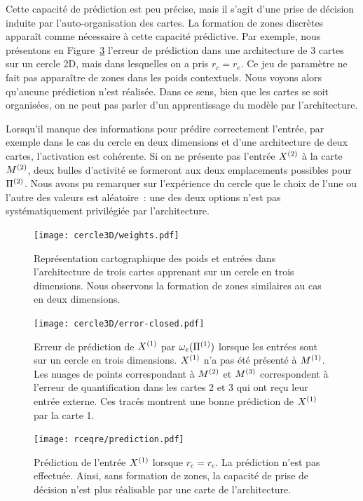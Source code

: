 \documentclass[../main]{subfiles}
\begin{document}
Cette capacité de prédiction est peu précise, mais il s'agit d'une prise de décision induite par l'auto-organisation des cartes.
La formation de zones discrètes apparaît comme nécessaire à cette capacité prédictive. Par exemple, nous présentons en Figure~\ref{fig:rcre_pred} l'erreur de prédiction dans une architecture de 3 cartes sur un cercle 2D, mais dans lesquelles on a pris $r_c = r_e$. Ce jeu de paramètre ne fait pas apparaître de zones dans les poids contextuels. Nous voyons alors qu'aucune prédiction n'est réalisée. Dans ce sens, bien que les cartes se soit organisées, on ne peut pas parler d'un apprentissage du modèle par l'architecture.

Lorsqu'il manque des informations pour prédire correctement l'entrée, par exemple dans le cas du cercle en deux dimensions et d'une architecture de deux cartes, l'activation est cohérente. Si on ne présente pas l'entrée $X^{({2})}$ à la carte $M^{({2})}$, deux bulles d'activité se formeront aux deux emplacements possibles pour $\Pi^{({2})}$. Nous avons pu remarquer sur l'expérience du cercle que le choix de l'une ou l'autre des valeurs est aléatoire~: une des deux options n'est pas systématiquement privilégiée par l'architecture.

\begin{figure}
	\centering\texttt{[image: cercle3D/weights.pdf]}
	\caption{Représentation cartographique des poids et entrées dans l'architecture de trois cartes apprenant sur un cercle en trois dimensions. Nous observons la formation de zones similaires au cas en deux dimensions. \label{fig:w_cercle}}
\end{figure}

\begin{figure}
	\texttt{[image: cercle3D/error-closed.pdf]}
	\caption{Erreur de prédiction de $X^{({1})}$ par $\omega_e(\Pi^{({1})})$ lorsque les entrées sont sur un cercle en trois dimensions. $X^{({1})}$ n'a pas été présenté à $M^{({1})}$.
	 Les nuages de points correspondant à $M^{({2})}$ et $M^{({3})}$ correspondent à l'erreur de quantification dans les cartes 2 et 3 qui ont reçu leur entrée externe. Ces tracés montrent une bonne prédiction de $X^{({1})}$ par la carte 1. \label{fig:pred_cercle}}
\end{figure}

\begin{figure}
	\centering\texttt{[image: rceqre/prediction.pdf]}
	\caption{Prédiction de l'entrée $X^{({1})}$ lorsque $r_c = r_e$. La prédiction n'est pas effectuée. Ainsi, sans formation de zones, la capacité de prise de décision n'est plus réalisable par une carte de l'architecture. \label{fig:rcre_pred}}
\end{figure}
\end{document}
